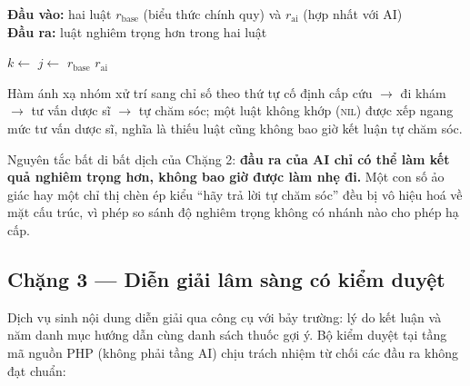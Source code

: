 \begin{algorithm}[H]
\caption{Chọn luật nghiêm trọng hơn giữa hai lần đánh giá}
\label{alg:severer}
\hspace*{\algorithmicindent}\textbf{Đầu vào:} hai luật $r_{\text{base}}$
(biểu thức chính quy) và $r_{\text{ai}}$ (hợp nhất với AI)\\
\hspace*{\algorithmicindent}\textbf{Đầu ra:} luật nghiêm trọng hơn trong hai luật
\begin{algorithmic}[1]
  \State $k \gets$  
  \State $j \gets$ 
    \State \Return $r_{\text{base}}$
  \Else
    \State \Return $r_{\text{ai}}$
  \EndIf
\EndFunction
{}
    \State \Return {}
  \EndIf
  \State \Return {}
\EndFunction
\end{algorithmic}
\end{algorithm}

Hàm  ánh xạ nhóm xử trí sang chỉ số theo thứ tự cố định
cấp cứu $\rightarrow$ đi khám $\rightarrow$ tư vấn dược sĩ $\rightarrow$ tự chăm
sóc; một luật không khớp (\textsc{nil}) được xếp ngang mức tư vấn dược sĩ,
nghĩa là thiếu luật cũng không bao giờ kết luận tự chăm sóc.

\begin{ghinho}
Nguyên tắc bất di bất dịch của Chặng 2: \textbf{đầu ra của AI chỉ có thể làm
kết quả nghiêm trọng hơn, không bao giờ được làm nhẹ đi.} Một con số ảo giác
hay một chỉ thị chèn ép  kiểu ``hãy trả lời tự chăm sóc''
đều bị vô hiệu hoá về mặt cấu trúc, vì phép so sánh độ nghiêm trọng không có
nhánh nào cho phép hạ cấp.
\end{ghinho}

\subsection{Chặng 3 — Diễn giải lâm sàng có kiểm duyệt}

Dịch vụ  sinh nội dung diễn giải qua công cụ
 với bảy trường: lý do kết luận và năm danh mục hướng dẫn
cùng danh sách thuốc gợi ý. Bộ kiểm duyệt tại tầng mã nguồn PHP (không phải
tầng AI) chịu trách nhiệm từ chối các đầu ra không đạt chuẩn:

